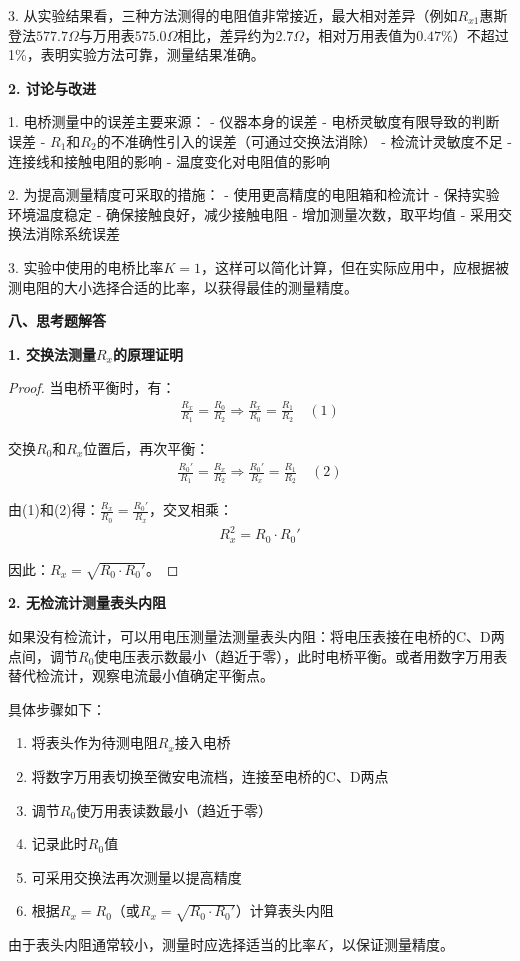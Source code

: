 ﻿\documentclass[12pt,a4paper]{article}
\begin{document}
3. 从实验结果看，三种方法测得的电阻值非常接近，最大相对差异（例如$R_{x1}$惠斯登法$577.7\Omega$与万用表$575.0\Omega$相比，差异约为$2.7\Omega$，相对万用表值为$0.47\%$）不超过1\%，表明实验方法可靠，测量结果准确。

\textbf{2. 讨论与改进}

1. 电桥测量中的误差主要来源：
   - 仪器本身的误差
   - 电桥灵敏度有限导致的判断误差
   - $R_1$和$R_2$的不准确性引入的误差（可通过交换法消除）
   - 检流计灵敏度不足
   - 连接线和接触电阻的影响
   - 温度变化对电阻值的影响

2. 为提高测量精度可采取的措施：
   - 使用更高精度的电阻箱和检流计
   - 保持实验环境温度稳定
   - 确保接触良好，减少接触电阻
   - 增加测量次数，取平均值
   - 采用交换法消除系统误差

3. 实验中使用的电桥比率$K=1$，这样可以简化计算，但在实际应用中，应根据被测电阻的大小选择合适的比率，以获得最佳的测量精度。

\textbf{八、思考题解答}

\textbf{1. 交换法测量$R_x$的原理证明}

\begin{proof}
当电桥平衡时，有：
\begin{align}
\frac{R_x}{R_1} = \frac{R_0}{R_2} \Rightarrow \frac{R_x}{R_0} = \frac{R_1}{R_2} \quad (1)
\end{align}

交换$R_0$和$R_x$位置后，再次平衡：
\begin{align}
\frac{R_0'}{R_1} = \frac{R_x}{R_2} \Rightarrow \frac{R_0'}{R_x} = \frac{R_1}{R_2} \quad (2)
\end{align}

由(1)和(2)得：$\frac{R_x}{R_0} = \frac{R_0'}{R_x}$，交叉相乘：
\begin{align}
R_x^2 = R_0 \cdot R_0'
\end{align}

因此：$R_x = \sqrt{R_0 \cdot R_0'}$。
\end{proof}

\textbf{2. 无检流计测量表头内阻}

如果没有检流计，可以用电压测量法测量表头内阻：将电压表接在电桥的C、D两点间，调节$R_0$使电压表示数最小（趋近于零），此时电桥平衡。或者用数字万用表替代检流计，观察电流最小值确定平衡点。

具体步骤如下：
\begin{enumerate}
    \item 将表头作为待测电阻$R_x$接入电桥
    \item 将数字万用表切换至微安电流档，连接至电桥的C、D两点
    \item 调节$R_0$使万用表读数最小（趋近于零）
    \item 记录此时$R_0$值
    \item 可采用交换法再次测量以提高精度
    \item 根据$R_x = R_0$（或$R_x = \sqrt{R_0 \cdot R_0'}$）计算表头内阻
\end{enumerate}

由于表头内阻通常较小，测量时应选择适当的比率$K$，以保证测量精度。
\end{document}
